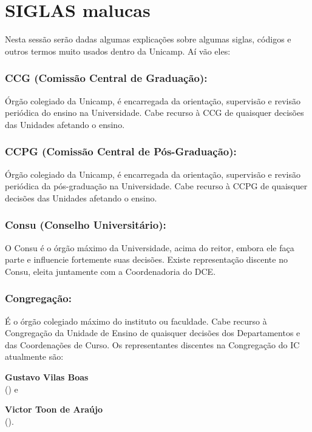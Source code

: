 
\section{SIGLAS malucas}

Nesta sessão serão dadas algumas explicações sobre algumas siglas, códigos e
outros termos muito usados dentro da Unicamp. Aí vão eles:

\subsubsection{CCG (Comissão Central de Graduação):} Órgão colegiado da
Unicamp, é encarregada da orientação, supervisão e revisão periódica do ensino
na Universidade. Cabe recurso à CCG de quaisquer decisões das Unidades afetando
o ensino.

\subsubsection{CCPG (Comissão Central de Pós-Graduação):} Órgão colegiado da
Unicamp, é encarregada da orientação, supervisão e revisão periódica da
pós-graduação na Universidade. Cabe recurso à CCPG de quaisquer decisões das
Unidades afetando o ensino.

\subsubsection{Consu (Conselho Universitário):} O Consu é o órgão máximo da
Universidade, acima do reitor, embora ele faça parte e influencie fortemente
suas decisões.  Existe representação discente no Consu, eleita juntamente com a
Coordenadoria do DCE.

\subsubsection{Congregação:} É o órgão colegiado máximo do instituto ou
faculdade.  Cabe recurso à Congregação da Unidade de Ensino de quaisquer
decisões dos Departamentos e das Coordenações de Curso. Os representantes
discentes na Congregação do IC atualmente são:

\begin{compactitemize}
\item \textbf{Gustavo Vilas Boas}
  \\() e
\item \textbf{Victor Toon de Araújo}
  \\().
\end{compactitemize}

